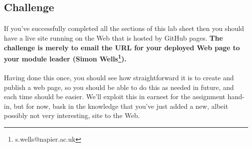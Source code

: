 \documentclass[10pt, a4paper]{article}
\begin{document}
\subsection{Challenge}
\paragraph{} If you've successfully completed all the sections of this lab sheet then you should have a live site running on the Web that is hosted by GitHub pages. {\bf The challenge is merely to email the URL for your deployed Web page to your module leader (Simon Wells\footnote{s.wells@napier.ac.uk}).}

\paragraph{} Having done this once, you should see how straightforward it is to create and publish a web page, so you should be able to do this as needed in future, and each time should be easier. We'll exploit this in earnest for the assignment hand-in, but for now, bask in the knowledge that you've just added a new, albeit possibly not very interesting, site to the Web.





\end{document}
